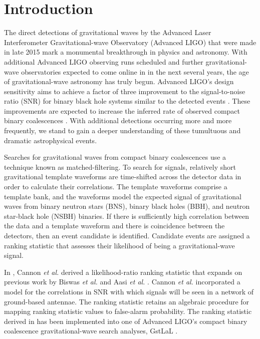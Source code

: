 \documentclass[twocolumn,showpacs,unsortedaddress,superscriptaddress,showkeys,nofootinbib,preprintnumbers,letterpaper]{revtex4-1}
\begin{document}
\maketitle
%


\section{Introduction}

The direct detections of gravitational waves by the Advanced Laser Interferometer Gravitational-wave Observatory (Advanced LIGO) that were made in late 2015 \cite{Abbott:2016blz, Abbott:2016nmj, TheLIGOScientific:2016pea} mark a monumental breakthrough in physics and astronomy. With additional Advanced LIGO observing runs scheduled and further gravitational-wave observatories expected to come online in in the next several years, the age of gravitational-wave astronomy has truly begun. Advanced LIGO's design sensitivity aims to achieve a factor of three improvement to the signal-to-noise ratio (SNR) for binary black hole systems similar to the detected events \cite{TheLIGOScientific:2016agk}. These improvements are expected to increase the inferred rate of observed compact binary coalescences \cite{Abbott:2016nhf}. With additional detections occurring more and more frequently, we stand to gain a deeper understanding of these tumultuous and dramatic astrophysical events. 

Searches for gravitational waves from compact binary coalescences use a technique known as matched-filtering. To search for signals, relatively short gravitational template waveforms are time-shifted across the detector data in order to calculate their correlations. The template waveforms comprise a template bank, and the waveforms model the expected signal of gravitational waves from binary neutron stars (BNS), binary black holes (BBH), and neutron star-black hole (NSBH) binaries. If there is sufficiently high correlation between the data and a template waveform and there is coincidence between the detectors, then an event candidate is identified. Candidate events are assigned a ranking statistic that assesses their likelihood of being a gravitational-wave signal. 

In \cite{2015arXiv150404632C}, Cannon {\it et al.} derived a likelihood-ratio ranking statistic that expands on previous work by Biswas {\it et al.} \cite{Biswas:2012tv} and Aasi {\it et al.} \cite{Aasi:2013vna}. Cannon {\it et al.} incorporated a model for the correlations in SNR with which signals will be seen in a network of ground-based antennae. The ranking statistic retains an algebraic procedure for mapping ranking statistic values to false-alarm probability. The ranking statistic derived in \cite{2015arXiv150404632C} has been implemented into one of Advanced LIGO's compact binary coalescence gravitational-wave search analyses, GstLaL \cite{Cannon:2011vi,Privitera:2013xza,Messick:2016}.
\end{document}
